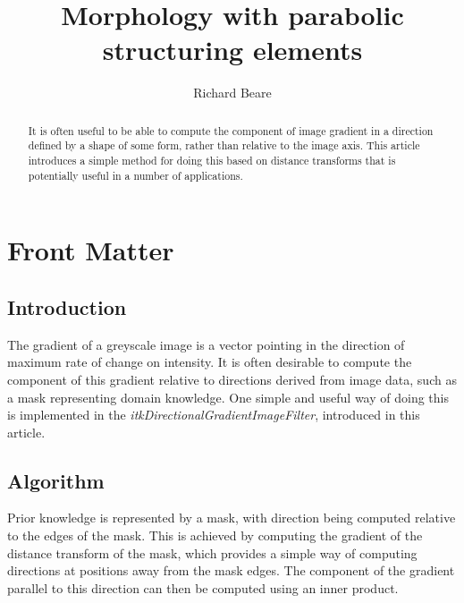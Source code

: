 \documentclass{InsightArticle}
\title{Morphology with parabolic structuring elements}
\author{Richard Beare}
\begin{document}
\maketitle

\ifhtml
\chapter*{Front Matter\label{front}}
\fi


\begin{abstract}
\noindent
It is often useful to be able to compute the component of image
gradient in a direction defined by a shape of some form, rather than
relative to the image axis. This article introduces a simple method
for doing this based on distance transforms that is potentially useful
in a number of applications.
\end{abstract}

\tableofcontents

\section{Introduction}
The gradient of a greyscale image is a vector pointing in the
direction of maximum rate of change on intensity. It is often
desirable to compute the component of this gradient relative to
directions derived from image data, such as a mask representing domain
knowledge. One simple and useful way of doing this is implemented in
the {\em itkDirectionalGradientImageFilter}, introduced in this
article.

\section{Algorithm}
Prior knowledge is represented by a mask, with direction being
computed relative to the edges of the mask. This is achieved by
computing the gradient of the distance transform of the mask, which
provides a simple way of computing directions at positions away from
the mask edges. The component of the gradient parallel to this
direction can then be computed using an inner product.
\end{document}

